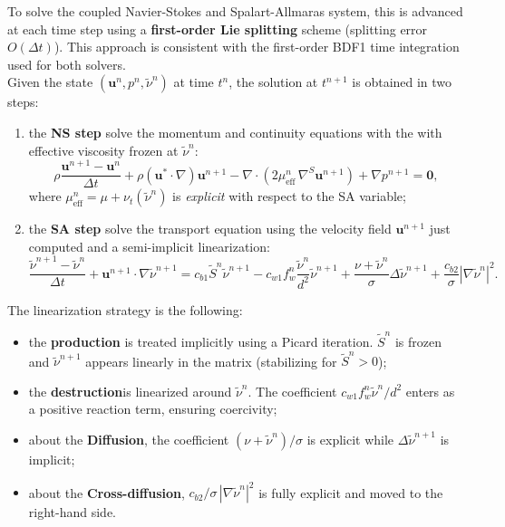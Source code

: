 To solve the coupled Navier-Stokes and Spalart-Allmaras system, this is advanced at each time step using a \textbf{first-order Lie splitting} scheme (splitting error $O(\Delta t)$). This approach is consistent with the first-order BDF1 time integration used for both solvers.\\

Given the state $(\mathbf{u}^n, p^n, \tilde{\nu}^n)$ at time $t^n$, the solution at $t^{n+1}$ is obtained in two steps:
\begin{enumerate}[itemsep=2ex, topsep=2ex]
  \item the \textbf{NS step} solve the momentum and continuity equations with the with effective viscosity frozen at $\tilde{\nu}^n$:
  \begin{equation*}
    \rho\frac{\mathbf{u}^{n+1}-\mathbf{u}^n}{\Delta t}
    + \rho(\mathbf{u}^* \cdot \nabla)\mathbf{u}^{n+1}
    - \nabla\cdot\!\left(2\mu_\text{eff}^n\,\nabla^S\mathbf{u}^{n+1}\right)
    + \nabla p^{n+1} = \mathbf{0},
  \end{equation*}
  where $\mu_{\text{eff}}^n = \mu + \nu_t(\tilde{\nu}^n)$ is \textit{explicit} with respect to the SA variable;
  \item the \textbf{SA step} solve the transport equation using the velocity field $\mathbf{u}^{n+1}$ just computed and a semi-implicit linearization:
  \[
    \frac{\tilde{\nu}^{n+1}-\tilde{\nu}^n}{\Delta t}
    + \mathbf{u}^{n+1}\cdot\nabla\tilde{\nu}^{n+1}
    = c_{b1}\tilde{S}^n\tilde{\nu}^{n+1}
    - c_{w1}f_w^n\frac{\tilde{\nu}^n}{d^2}\tilde{\nu}^{n+1}
    + \frac{\nu+\tilde{\nu}^n}{\sigma}\Delta\tilde{\nu}^{n+1}
    + \frac{c_{b2}}{\sigma}|\nabla\tilde{\nu}^n|^2.
  \]
\end{enumerate}
\vspace{2ex}
The linearization strategy is the following:
\begin{itemize}[itemsep=2ex, topsep=2ex]
  \item[-] the \textbf{production} is treated implicitly using a Picard iteration. $\tilde{S}^n$ is frozen and $\tilde{\nu}^{n+1}$ appears linearly in the matrix (stabilizing for $\tilde{S}^n > 0$);
  \item[-] the \textbf{destruction}is linearized around $\tilde{\nu}^n$. The coefficient $c_{w1}f_w^n\tilde{\nu}^n/d^2$ enters as a positive reaction term, ensuring coercivity;
  \item[-] about the \textbf{Diffusion}, the coefficient $(\nu+\tilde{\nu}^n)/\sigma$ is explicit while $\Delta\tilde{\nu}^{n+1}$ is implicit;
  \item[-] about the \textbf{Cross-diffusion}, $c_{b2}/\sigma\,|\nabla\tilde{\nu}^n|^2$ is fully explicit and moved to the right-hand side.
\end{itemize}

